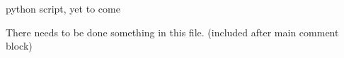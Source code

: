 
\begin{DoxyRefList}
\item[\label{todo__todo000002}%
\hypertarget{todo__todo000002}{}%
Page \hyperlink{tools}{Configuration and use of mtoc++} ]python script, yet to come 
\item[\label{todo__todo000001}%
\hypertarget{todo__todo000001}{}%
Member \hyperlink{classexamples_1_1_class_a4ef013b3b72f538d2264c9e32aea0b34}{examples\+:\+:Class\+:\+:example\+\_\+function} (\hyperlink{classdouble}{double} param1,\+::\+Class param2)]There needs to be done something in this file. (included after main comment block) 
\end{DoxyRefList}